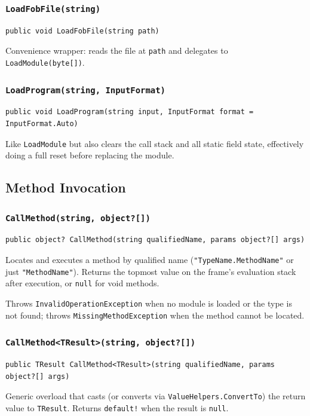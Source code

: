 \documentclass[11pt,a4paper]{article}
\newcommand{\code}[1]{\texttt{\small #1}}
\newcommand{\typename}[1]{\textcolor{typecolor}{\texttt{\small #1}}}
\begin{document}
\subsubsection{\texttt{LoadFobFile(string)}}
\begin{lstlisting}[style=cs]
public void LoadFobFile(string path)
\end{lstlisting}
Convenience wrapper: reads the file at \code{path} and delegates to
\code{LoadModule(byte[])}.

\subsubsection{\texttt{LoadProgram(string, InputFormat)}}
\begin{lstlisting}[style=cs]
public void LoadProgram(string input, InputFormat format = InputFormat.Auto)
\end{lstlisting}
Like \code{LoadModule} but also clears the call stack and all static field
state, effectively doing a full reset before replacing the module.

\subsection{Method Invocation}

\subsubsection{\texttt{CallMethod(string, object?[])}}
\begin{lstlisting}[style=cs]
public object? CallMethod(string qualifiedName, params object?[] args)
\end{lstlisting}
Locates and executes a method by qualified name (\texttt{"TypeName.MethodName"} or
just \texttt{"MethodName"}). Returns the topmost value on the frame's evaluation stack
after execution, or \code{null} for void methods.

Throws \typename{InvalidOperationException} when no module is loaded or the type
is not found; throws \typename{MissingMethodException} when the method cannot be
located.

\subsubsection{\texttt{CallMethod<TResult>(string, object?[])}}
\begin{lstlisting}[style=cs]
public TResult CallMethod<TResult>(string qualifiedName, params object?[] args)
\end{lstlisting}
Generic overload that casts (or converts via \typename{ValueHelpers}\code{.ConvertTo})
the return value to \code{TResult}. Returns \code{default!} when the result is
\code{null}.
\end{document}
